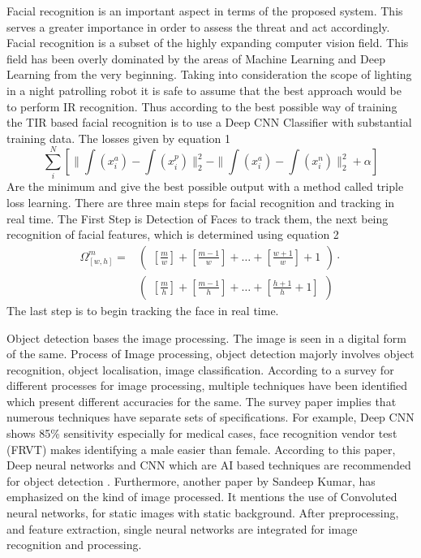 \documentclass[journal]{IEEEtran}
\begin{document}
Facial recognition is an important aspect in terms of the
proposed system. This serves a greater importance in order
to assess the threat and act accordingly.\cite{[2]} Facial
recognition is a subset of the highly expanding computer
vision field. This field has been overly dominated by the
areas of Machine Learning and Deep Learning from the very
beginning\cite{[5]}. Taking into consideration the scope of
lighting in a night patrolling robot it is safe to assume
that the best approach would be to perform IR recognition\cite{[2]}.
Thus according to \cite{[2]} the best possible way of training
the TIR based facial recognition is to use a Deep CNN
Classifier with substantial training data. The losses
given by equation 1
\begin{equation}
	\sum_i^N[\| \int (x_i^a) - \int (x_i^p)\|_2^2 - \| \int (x_i^a) - \int (x_i^n)\|_2^2 + \alpha]
\end{equation}
Are the minimum and give the best possible output with a
method called triple loss learning.\cite{[2]} There are
three main steps for facial recognition and tracking in
real time\cite{[4]}. The First Step is Detection of Faces to track
them, the next being recognition of facial features, which is determined
using equation 2
\begin{equation}
	\begin{aligned}
		\Omega^m_{[w, h]} =
		 & \begin{pmatrix}
			   [\frac{m}{w}] + [\frac{m - 1}{w}] + \ldots + [\frac{w + 1}{w}] + 1
		   \end{pmatrix}
		\cdot                                                                          \\
		 & \begin{pmatrix}
			   [\frac{m}{h}] + [\frac{m - 1}{h}] + \ldots + [\frac{h + 1}{h} + 1]
		   \end{pmatrix}
	\end{aligned}
\end{equation}
The last step is to begin tracking the face in real time.

Object detection bases the image processing. The image is
seen in a digital form of the same. Process of Image
processing, object detection majorly involves object recognition,
object localisation, image classification. According to a
survey for different processes for image processing,
multiple techniques have been identified which present
different accuracies for the same. The survey paper implies
that numerous techniques have separate sets of specifications.
For example, Deep CNN shows 85\% sensitivity especially for
medical cases, face recognition vendor test (FRVT) makes
identifying a male easier than female. According to this paper,
Deep neural networks and CNN which are AI based techniques are
recommended for object detection \cite{[9]}.  Furthermore, another
paper by Sandeep Kumar, has emphasized on the kind of image
processed. It mentions the use of Convoluted neural networks,
for static images with static background. After preprocessing,
and feature extraction, single neural networks are integrated
for image recognition and processing\cite{[10]}.
\end{document}
